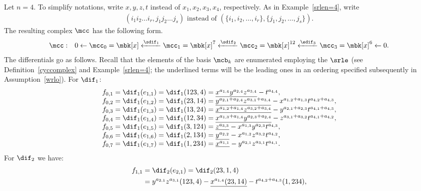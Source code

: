 \begin{example}\label{cyc4}
Let $n=4$. To simplify notations, write $x,y,z,t$ instead of
$x_1,x_2,x_3,x_4$, respectively. As in Example~\ref{srlen=4}, write
\begin{eqnarray*}
(i_1i_2\ldots i_r,j_1j_2\ldots j_s)\mbox{ instead of }(\{i_1,i_2,\ldots
,i_r\},\{j_1,j_2,\ldots ,j_s\}).
\end{eqnarray*}
The resulting complex $\mcc$ has the following form.
\begin{eqnarray*}
\mcc&:&0\leftarrow
\mcc_0=\mbk[x]\xleftarrow{\sdif_{1}}\mcc_{1}=\mbk[x]^{7}
\xleftarrow{\sdif_{2}}\mcc_{2}=\mbk[x]^{12}\xleftarrow{\sdif_{3}}
\mcc_{3}=\mbk[x]^{6}\xleftarrow{} 0.
\end{eqnarray*}
The differentials go as follows. Recall that the elements of the basis
$\mcb_k$ are enumerated employing the $\srle$ (see
Definition~\ref{cyccomplex} and Example~\ref{srlen=4}; the underlined
terms will be the leading ones in an ordering specified subsequently
in Assumption~\ref{wrlo}). For $\dif_1$:
\begin{eqnarray*}
\begin{array}{l}
f_{0,1}=\dif_1(e_{1,1})=\dif_1(123,4)=
\underline{x^{a_{1,4}}y^{a_{2,4}}z^{a_{3,4}}}-t^{a_{4,4}},\\
f_{0,2}=\dif_1(e_{1,2})=\dif_1(23,14)=
\underline{y^{a_{2,1}+a_{2,4}}z^{a_{3,1}+a_{3,4}}}-
x^{a_{1,2}+a_{1,3}}t^{a_{4,2}+a_{4,3}},\\
f_{0,3}=\dif_1(e_{1,3})=\dif_1(13,24)=
\underline{x^{a_{1,2}+a_{1,4}}z^{a_{3,2}+a_{3,4}}}-
y^{a_{2,1}+a_{2,3}}t^{a_{4,1}+a_{4,3}},\\
f_{0,4}=\dif_1(e_{1,4})=\dif_1(12,34)=
\underline{x^{a_{1,3}+a_{1,4}}y^{a_{2,3}+a_{2,4}}}-
z^{a_{3,1}+a_{3,2}}t^{a_{4,1}+a_{4,2}},\\
f_{0,5}=\dif_1(e_{1,5})=\dif_1(3,124)=
\underline{z^{a_{3,3}}}-x^{a_{1,3}}y^{a_{2,3}}t^{a_{4,3}},\\
f_{0,6}=\dif_1(e_{1,6})=\dif_1(2,134)=
\underline{y^{a_{2,2}}}-x^{a_{1,2}}z^{a_{3,2}}t^{a_{4,2}},\\
f_{0,7}=\dif_1(e_{1,7})=\dif_1(1,234)=
\underline{x^{a_{1,1}}}-y^{a_{2,1}}z^{a_{3,1}}t^{a_{4,1}}.
\end{array}
\end{eqnarray*}
For $\dif_2$ we have:
\begin{align*}
f_{1,1}&= \dif_2(e_{2,1})=\dif_2(23,1,4)\\
&= y^{a_{2,1}}z^{a_{3,1}}(123,4)-\underline{x^{a_{1,4}}(23,14)}-
t^{a_{4,2}+a_{4,3}}(1,234),\\

\end{align*}
\end{example}
